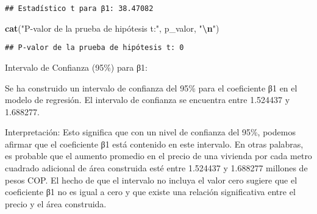 \documentclass[
]{article}
\newenvironment{Shaded}{\begin{snugshade}}{\end{snugshade}}
\newcommand{\AttributeTok}[1]{\textcolor[rgb]{0.13,0.29,0.53}{#1}}
\newcommand{\CommentTok}[1]{\textcolor[rgb]{0.56,0.35,0.01}{\textit{#1}}}
\newcommand{\DecValTok}[1]{\textcolor[rgb]{0.00,0.00,0.81}{#1}}
\newcommand{\FunctionTok}[1]{\textcolor[rgb]{0.13,0.29,0.53}{\textbf{#1}}}
\newcommand{\NormalTok}[1]{#1}
\newcommand{\OtherTok}[1]{\textcolor[rgb]{0.56,0.35,0.01}{#1}}
\newcommand{\SpecialCharTok}[1]{\textcolor[rgb]{0.81,0.36,0.00}{\textbf{#1}}}
\newcommand{\StringTok}[1]{\textcolor[rgb]{0.31,0.60,0.02}{#1}}
\begin{document}
\begin{Shaded}
\end{Shaded}

\begin{verbatim}
## Estadístico t para β1: 38.47082
\end{verbatim}

\begin{Shaded}
\begin{Highlighting}[]
\FunctionTok{cat}\NormalTok{(}\StringTok{"P{-}valor de la prueba de hipótesis t:"}\NormalTok{, p\_valor, }\StringTok{"}\SpecialCharTok{\textbackslash{}n}\StringTok{"}\NormalTok{)}
\end{Highlighting}
\end{Shaded}

\begin{verbatim}
## P-valor de la prueba de hipótesis t: 0
\end{verbatim}

Intervalo de Confianza (95\%) para β1:

Se ha construido un intervalo de confianza del 95\% para el coeficiente
β1 en el modelo de regresión. El intervalo de confianza se encuentra
entre 1.524437 y 1.688277.

Interpretación: Esto significa que con un nivel de confianza del 95\%,
podemos afirmar que el coeficiente β1 está contenido en este intervalo.
En otras palabras, es probable que el aumento promedio en el precio de
una vivienda por cada metro cuadrado adicional de área construida esté
entre 1.524437 y 1.688277 millones de pesos COP. El hecho de que el
intervalo no incluya el valor cero sugiere que el coeficiente β1 no es
igual a cero y que existe una relación significativa entre el precio y
el área construida.
\end{document}
